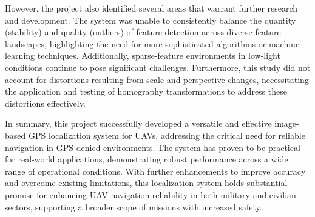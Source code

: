 However, the project also identified several areas that warrant further research and development. The system was unable to consistently balance the quantity (stability) and quality (outliers) of feature detection across diverse feature landscapes, highlighting the need for more sophisticated algorithms or machine-learning techniques. Additionally, sparse-feature environments in low-light conditions continue to pose significant challenges. Furthermore, this study did not account for distortions resulting from scale and perspective changes, necessitating the application and testing of homography transformations to address these distortions effectively.

In summary, this project successfully developed a versatile and effective image-based GPS localization system for UAVs, addressing the critical need for reliable navigation in GPS-denied environments. The system has proven to be practical for real-world applications, demonstrating robust performance across a wide range of operational conditions. With further enhancements to improve accuracy and overcome existing limitations, this localization system holds substantial promise for enhancing UAV navigation reliability in both military and civilian sectors, supporting a broader scope of missions with increased safety. 